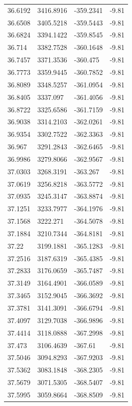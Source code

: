 \begin{table}[H]
\begin{tabular}{llll}
36.6192 & 3416.8916 & -359.2341 & -9.81 \\
36.6508 & 3405.5218 & -359.5443 & -9.81 \\
36.6824 & 3394.1422 & -359.8545 & -9.81 \\
36.714 & 3382.7528 & -360.1648 & -9.81 \\
36.7457 & 3371.3536 & -360.475 & -9.81 \\
36.7773 & 3359.9445 & -360.7852 & -9.81 \\
36.8089 & 3348.5257 & -361.0954 & -9.81 \\
36.8405 & 3337.097 & -361.4056 & -9.81 \\
36.8722 & 3325.6586 & -361.7159 & -9.81 \\
36.9038 & 3314.2103 & -362.0261 & -9.81 \\
36.9354 & 3302.7522 & -362.3363 & -9.81 \\
36.967 & 3291.2843 & -362.6465 & -9.81 \\
36.9986 & 3279.8066 & -362.9567 & -9.81 \\
37.0303 & 3268.3191 & -363.267 & -9.81 \\
37.0619 & 3256.8218 & -363.5772 & -9.81 \\
37.0935 & 3245.3147 & -363.8874 & -9.81 \\
37.1251 & 3233.7977 & -364.1976 & -9.81 \\
37.1568 & 3222.271 & -364.5078 & -9.81 \\
37.1884 & 3210.7344 & -364.8181 & -9.81 \\
37.22 & 3199.1881 & -365.1283 & -9.81 \\
37.2516 & 3187.6319 & -365.4385 & -9.81 \\
37.2833 & 3176.0659 & -365.7487 & -9.81 \\
37.3149 & 3164.4901 & -366.0589 & -9.81 \\
37.3465 & 3152.9045 & -366.3692 & -9.81 \\
37.3781 & 3141.3091 & -366.6794 & -9.81 \\
37.4097 & 3129.7038 & -366.9896 & -9.81 \\
37.4414 & 3118.0888 & -367.2998 & -9.81 \\
37.473 & 3106.4639 & -367.61 & -9.81 \\
37.5046 & 3094.8293 & -367.9203 & -9.81 \\
37.5362 & 3083.1848 & -368.2305 & -9.81 \\
37.5679 & 3071.5305 & -368.5407 & -9.81 \\
37.5995 & 3059.8664 & -368.8509 & -9.81 \\

\end{tabular}
\end{table}
